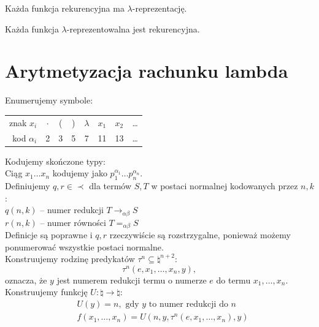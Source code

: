 \begin{theorem}[Church, 1936]
    Każda funkcja rekurencyjna ma \(\lambda\)-reprezentację.
\end{theorem}

\begin{theorem}
    Każda funkcja \(\lambda\)-reprezentowalna jest rekurencyjna.
\end{theorem}
\section{Arytmetyzacja rachunku lambda}
Enumerujemy symbole:
\begin{center}
\begin{tabular}{ r | c c c c c c c }
 znak \(x_i\) & \(\cdot\) & ( & ) & \(\lambda\) & \(x_1\) & \(x_2\) & \dots \\ 
kod \(\alpha_i\) & 2 & 3 & 5 & 7 & 11 & 13 & \dots
\end{tabular}
\end{center}

Kodujemy skończone typy: \\
Ciąg \( x_1 \ldots x_n \) kodujemy jako \( p_1^{\alpha_1} \ldots p_n^{\alpha_n} \). \\

Definiujemy \(q, r \in \prec\) dla termów \(S, T\) w postaci normalnej kodowanych przez \(n, k\): \\
\(q(n,k)\) -- numer redukcji \(T \to_{\alpha\beta} S\) \\
\(r(n,k)\) -- numer równości \(T =_{\alpha\beta} S\) \\
Definicje są poprawne i \(q,r\) rzeczywiście są rozstrzygalne, ponieważ możemy ponumerować wszystkie postaci normalne. \\

Konstruujemy rodzinę predykatów \( \tau^n \subseteq \natural^{n+2} \):
\[ \tau^n(e, x_1, \ldots, x_n, y), \]
oznacza, że \(y\) jest numerem redukcji termu o numerze \(e\) do termu \(x_1, \ldots, x_n\). \\

Konstruujemy funkcję \(U: \natural \to \natural\):
\begin{align*}
    & U(y) = n, \text{ gdy } y \text{ to numer redukcji do } n \\
    & f(x_1, \ldots, x_n) = U(n, y, \tau^n(e, x_1, \ldots, x_n), y)
\end{align*}